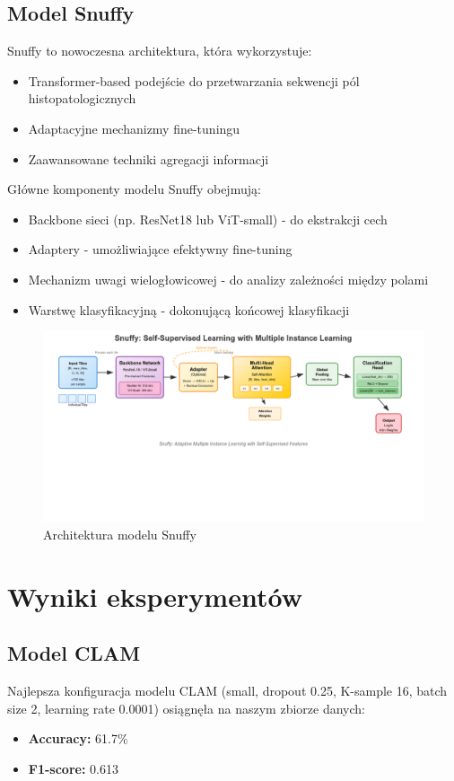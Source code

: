 \documentclass{article}
\begin{document}
\subsection{Model Snuffy}
Snuffy to nowoczesna architektura, która wykorzystuje:
\begin{itemize}
    \item Transformer-based podejście do przetwarzania sekwencji pól histopatologicznych
    \item Adaptacyjne mechanizmy fine-tuningu
    \item Zaawansowane techniki agregacji informacji
\end{itemize}

Główne komponenty modelu Snuffy obejmują:
\begin{itemize}
    \item Backbone sieci (np. ResNet18 lub ViT-small) - do ekstrakcji cech
    \item Adaptery - umożliwiające efektywny fine-tuning
    \item Mechanizm uwagi wielogłowicowej - do analizy zależności między polami
    \item Warstwę klasyfikacyjną - dokonującą końcowej klasyfikacji
\end{itemize}

\begin{figure}[H]
    \centering
    \includegraphics[width=1.0\textwidth]{figures/snuffy_architecture.png}
    \caption{Architektura modelu Snuffy}
    \label{fig:snuffy_arch}
\end{figure}

\section{Wyniki eksperymentów}

\subsection{Model CLAM}
Najlepsza konfiguracja modelu CLAM (small, dropout 0.25, K-sample 16, batch size 2, learning rate 0.0001) osiągnęła na naszym zbiorze danych:
\begin{itemize}
    \item \textbf{Accuracy:} 61.7\%
    \item \textbf{F1-score:} 0.613
\end{itemize}
\end{document}
